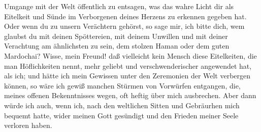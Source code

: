 Umgange mit der Welt öffentlich zu entsagen, was das wahre Licht dir als
Eitelkeit und Sünde im Verborgenen deines Herzens zu
erkennen gegeben hat. Oder
wenn du zu unsern Verächtern gehörst, so sage mir, ich bitte dich, wem glaubst
du mit deinen Spöttereien, mit deinem Unwillen und mit deiner Verachtung am
ähnlichsten zu sein, dem stolzen Haman oder dem guten Mardochai? Wisse, mein
Freund! daß vielleicht kein Mensch diese Eitelkeiten, die man Höflichkeiten
nennt, mehr geliebt und verschwenderischer angewendet hat, als ich; und hätte
ich mein Gewissen unter den Zeremonien der Welt verbergen können, so wäre ich
gewiß manchen Stürmen von Vorwürfen entgangen, die, meines offenen
Bekenntnisses
wegen, oft heftig über mich ausbrechen. Aber dann würde ich auch, wenn ich, nach
den weltlichen Sitten und Gebräurhen mich bequemt
hatte, wider meinen Gott
gesündigt und den Frieden meiner Seele verloren haben.

\medskip

